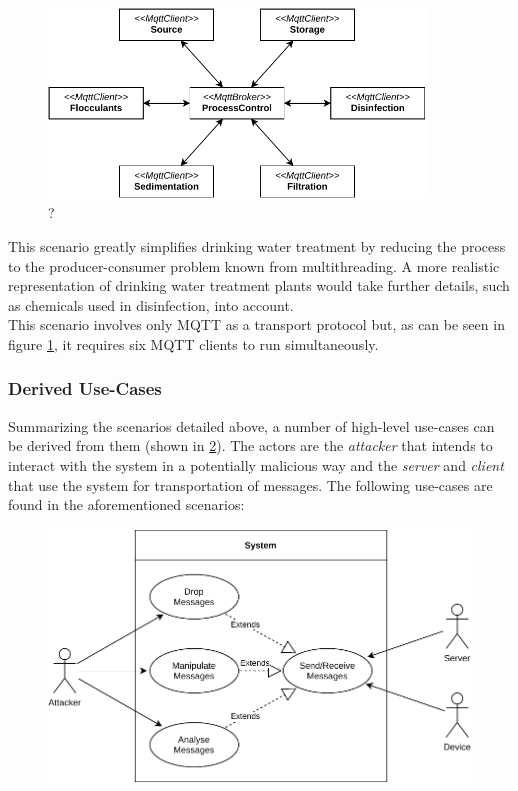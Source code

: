\begin{figure}[h!]
    \centering
    \includegraphics[width=10cm]{img/ch04/Scenario_WTP.pdf}
    \caption[?]{?}
    \label{fig:arch-water-treatment}
\end{figure}
This scenario greatly simplifies drinking water treatment by reducing the process to the producer-consumer problem known from multithreading. A more realistic representation of drinking water treatment plants would take further details, such as chemicals used in disinfection, into account.\\ %
This scenario involves only \ac{MQTT} as a transport protocol but, as can be seen in figure \ref{fig:arch-water-treatment}, it requires six \ac{MQTT} clients to run simultaneously.

\subsubsection{Derived Use-Cases} Summarizing the scenarios detailed above, a number of high-level use-cases can be derived from them (shown in \ref{fig:use-cases-scenarios}). The actors are the \emph{attacker} that intends to interact with the system in a potentially malicious way and the \emph{server} and \emph{client} that use the system for transportation of messages. The following use-cases are found in the aforementioned scenarios:

\begin{figure}[h]
    \centering
    \includegraphics[width=14cm]{img/ch04/UseCases_Scenarios.pdf}
    \label{fig:use-cases-scenarios}
\end{figure}


